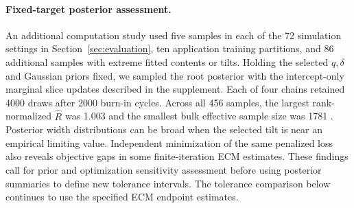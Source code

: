 \paragraph{Fixed-target posterior assessment.}
An additional computation study used five samples in each of the 72 simulation settings
in Section~\ref{sec:evaluation}, ten application training partitions, and 86
additional samples with extreme fitted contents or tilts. Holding the selected
\(q,\delta\) and Gaussian priors fixed, we sampled the root posterior with
the intercept-only marginal slice updates described in the supplement.
Each of four
chains retained 4000 draws after 2000 burn-in cycles. Across all 456 samples,
the largest rank-normalized \(\widehat R\) was 1.003 and the smallest bulk
effective sample size was 1781 \citep{VehtariEtAl2021Rhat}.
Posterior width distributions can be broad when the selected tilt is near an
empirical limiting value. Independent minimization of the same penalized
loss also reveals objective gaps in some finite-iteration ECM estimates.
These findings call for prior and optimization sensitivity assessment
before using posterior summaries to define new tolerance intervals.
The tolerance comparison below continues
to use the specified ECM endpoint estimates.
